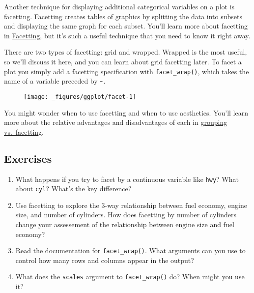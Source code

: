 Another technique for displaying additional categorical variables on a
plot is facetting. Facetting creates tables of graphics by splitting the
data into subsets and displaying the same graph for each subset. You'll
learn more about facetting in
\protect\hyperlink{sec:facetting}{Facetting}, but it's such a useful
technique that you need to know it right away. 

There are two types of facetting: grid and wrapped. Wrapped is the most
useful, so we'll discuss it here, and you can learn about grid facetting
later. To facet a plot you simply add a facetting specification with
\texttt{facet\_wrap()}, which takes the name of a variable preceded by
\texttt{\textasciitilde{}}. 

\begin{Shaded}
\begin{Highlighting}[]
\StringTok{ }
\StringTok{  }\NormalTok{() +}\StringTok{ }
\StringTok{  }
\end{Highlighting}
\end{Shaded}

\begin{figure}[H]
  \texttt{[image: \_figures/ggplot/facet-1]}
\end{figure}

You might wonder when to use facetting and when to use aesthetics.
You'll learn more about the relative advantages and disadvantages of
each in \protect\hyperlink{sub:group-vs-facet}{grouping vs.~facetting}.

\subsection{Exercises}\label{exercises-3}

\begin{enumerate}
\def\labelenumi{\arabic{enumi}.}
\item
  What happens if you try to facet by a continuous variable like
  \texttt{hwy}? What about \texttt{cyl}? What's the key difference?
\item
  Use facetting to explore the 3-way relationship between fuel economy,
  engine size, and number of cylinders. How does facetting by number of
  cylinders change your assessement of the relationship between engine
  size and fuel economy?
\item
  Read the documentation for \texttt{facet\_wrap()}. What arguments can
  you use to control how many rows and columns appear in the output?
\item
  What does the \texttt{scales} argument to \texttt{facet\_wrap()} do?
  When might you use it?
\end{enumerate}

